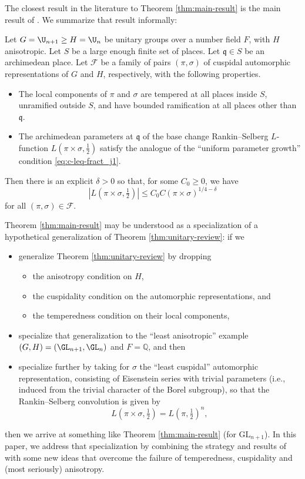 The closest result in the literature to Theorem \ref{thm:main-result} is the main result of \cite{2020arXiv201202187N}.  We summarize that result informally:
\begin{theorem}\label{thm:unitary-review}
  Let $G = \U_{n+1} \geq H = \U_n$ be unitary groups over a number field $F$, with $H$ anisotropic.  Let $S$ be a large enough finite set of places.  Let $\mathfrak{q} \in S$ be an archimedean place.  Let $\mathcal{F}$ be a family of pairs $(\pi,\sigma)$ of cuspidal automorphic representations of $G$ and $H$, respectively, with the following properties.
  \begin{itemize}
  \item The local components of $\pi$ and $\sigma$ are tempered at all places inside $S$, unramified outside $S$, and have bounded ramification at all places other than $\mathfrak{q}$.
  \item The archimedean parameters at $\mathfrak{q}$ of the base change Rankin--Selberg $L$-function $L(\pi \times \sigma, \tfrac{1}{2})$ satisfy the analogue of the ``uniform parameter growth'' condition \eqref{eq:c-leq-fract_j1}.
  \end{itemize}
  Then there is an explicit $\delta > 0$ so that, for some $C_0 \geq 0$, we have
  \begin{equation*}
    |L(\pi \times \sigma, \tfrac{1}{2})| \leq C_0 C(\pi \times \sigma)^{1/4-\delta}
  \end{equation*}
  for all $(\pi,\sigma) \in \mathcal{F}$.
\end{theorem}
Theorem \ref{thm:main-result} may be understood as a specialization of a hypothetical generalization of Theorem \ref{thm:unitary-review}: if we
\begin{itemize}
\item generalize Theorem \ref{thm:unitary-review} by dropping
  \begin{itemize}
  \item the anisotropy condition on $H$,
  \item the cuspidality condition on the automorphic representations, and
  \item the temperedness condition on their local components,
  \end{itemize}
\item specialize that generalization to the ``least anisotropic'' example $(G,H) = (\GL_{n+1}, \GL_n)$ and $F = \mathbb{Q}$, and then
\item specialize further by taking for $\sigma$ the ``least cuspidal'' automorphic representation, consisting of Eisenstein series with trivial parameters (i.e., induced from the trivial character of the Borel subgroup), so that the Rankin--Selberg convolution is given by
  \begin{equation*}
    L(\pi \times \sigma, \tfrac{1}{2}) = L(\pi, \tfrac{1}{2})^n,
  \end{equation*}
\end{itemize}
then we arrive at something like Theorem \ref{thm:main-result} (for $\mathrm{GL}_{n + 1}$).  In this paper, we address that specialization by combining the strategy and results of \cite{2020arXiv201202187N} with some new ideas that overcome the failure of temperedness, cuspidality and (most seriously) anisotropy.

